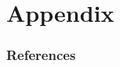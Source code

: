 \documentclass[tikz]{beamer}
\begin{document}

\appendix
\section*{Appendix}
\begin{frame}{}
    \sectionpage
\end{frame}


\begin{frame}[allowframebreaks]
    \frametitle{References}
    
    
\end{frame}
\end{document}
